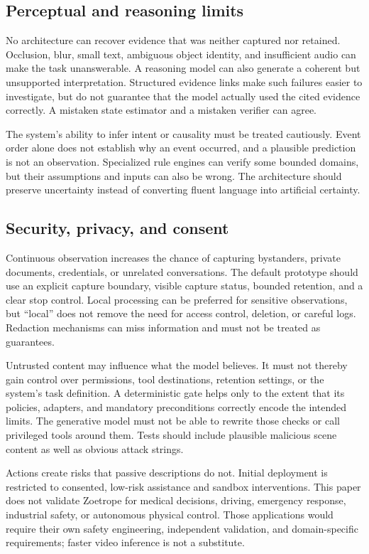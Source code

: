 \documentclass[11pt,letterpaper]{article}
\begin{document}
\subsection{Perceptual and reasoning limits}
No architecture can recover evidence that was neither captured nor retained. Occlusion, blur, small text, ambiguous object identity, and insufficient audio can make the task unanswerable. A reasoning model can also generate a coherent but unsupported interpretation. Structured evidence links make such failures easier to investigate, but do not guarantee that the model actually used the cited evidence correctly. A mistaken state estimator and a mistaken verifier can agree.

The system's ability to infer intent or causality must be treated cautiously. Event order alone does not establish why an event occurred, and a plausible prediction is not an observation. Specialized rule engines can verify some bounded domains, but their assumptions and inputs can also be wrong. The architecture should preserve uncertainty instead of converting fluent language into artificial certainty.

\subsection{Security, privacy, and consent}
Continuous observation increases the chance of capturing bystanders, private documents, credentials, or unrelated conversations. The default prototype should use an explicit capture boundary, visible capture status, bounded retention, and a clear stop control. Local processing can be preferred for sensitive observations, but ``local'' does not remove the need for access control, deletion, or careful logs. Redaction mechanisms can miss information and must not be treated as guarantees.

Untrusted content may influence what the model believes. It must not thereby gain control over permissions, tool destinations, retention settings, or the system's task definition. A deterministic gate helps only to the extent that its policies, adapters, and mandatory preconditions correctly encode the intended limits. The generative model must not be able to rewrite those checks or call privileged tools around them. Tests should include plausible malicious scene content as well as obvious attack strings.

Actions create risks that passive descriptions do not. Initial deployment is restricted to consented, low-risk assistance and sandbox interventions. This paper does not validate Zoetrope for medical decisions, driving, emergency response, industrial safety, or autonomous physical control. Those applications would require their own safety engineering, independent validation, and domain-specific requirements; faster video inference is not a substitute.
\end{document}
